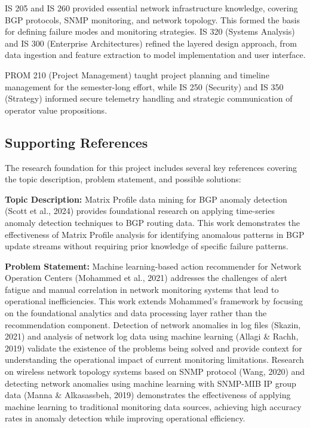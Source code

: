 \documentclass[11pt]{article}
\begin{document}
IS 205 and IS 260 provided essential network infrastructure knowledge, covering BGP protocols, SNMP monitoring, and network topology. This formed the basis for defining failure modes and monitoring strategies. IS 320 (Systems Analysis) and IS 300 (Enterprise Architectures) refined the layered design approach, from data ingestion and feature extraction to model implementation and user interface.

PROM 210 (Project Management) taught project planning and timeline management for the semester-long effort, while IS 250 (Security) and IS 350 (Strategy) informed secure telemetry handling and strategic communication of operator value propositions.

\subsection{Supporting References}

The research foundation for this project includes several key references covering the topic description, problem statement, and possible solutions:

\textbf{Topic Description:} Matrix Profile data mining for BGP anomaly detection (Scott et al., 2024) provides foundational research on applying time-series anomaly detection techniques to BGP routing data. This work demonstrates the effectiveness of Matrix Profile analysis for identifying anomalous patterns in BGP update streams without requiring prior knowledge of specific failure patterns.

\textbf{Problem Statement:} Machine learning-based action recommender for Network Operation Centers (Mohammed et al., 2021) addresses the challenges of alert fatigue and manual correlation in network monitoring systems that lead to operational inefficiencies. This work extends Mohammed's framework by focusing on the foundational analytics and data processing layer rather than the recommendation component. Detection of network anomalies in log files (Skazin, 2021) and analysis of network log data using machine learning (Allagi \& Rachh, 2019) validate the existence of the problems being solved and provide context for understanding the operational impact of current monitoring limitations. Research on wireless network topology systems based on SNMP protocol (Wang, 2020) and detecting network anomalies using machine learning with SNMP-MIB IP group data (Manna \& Alkasassbeh, 2019) demonstrates the effectiveness of applying machine learning to traditional monitoring data sources, achieving high accuracy rates in anomaly detection while improving operational efficiency.
\end{document}
